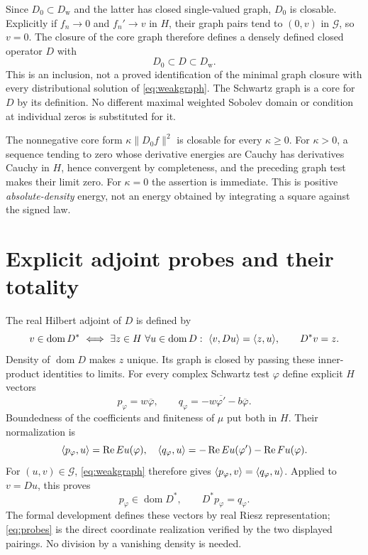 \documentclass[11pt]{article}
\newcommand{\dom}{\operatorname{dom}}\newcommand{\ran}{\operatorname{ran}}
\begin{document}
Since $D_0\subset D_{\mathrm w}$ and the latter has closed
single-valued graph, $D_0$ is closable. Explicitly if $f_n\to0$
and $f_n'\to v$ in $H$, their graph pairs tend to $(0,v)$ in
$\mathcal G$, so $v=0$. The closure of the core graph therefore
defines a densely defined closed operator $D$ with
\begin{equation}\label{eq:minimalweak}
 D_0\subset D\subset D_{\mathrm w}.
\end{equation}
This is an inclusion, not a proved identification of the minimal
graph closure with every distributional solution of
\eqref{eq:weakgraph}. The Schwartz graph is a core for $D$ by
its definition. No different maximal weighted Sobolev domain or
condition at individual zeros is substituted for it.

The nonnegative core form $\kappa\|D_0f\|^2$ is closable for
every $\kappa\geq0$. For $\kappa>0$, a sequence tending to zero
whose derivative energies are Cauchy has derivatives Cauchy in
$H$, hence convergent by completeness, and the preceding graph
test makes their limit zero. For $\kappa=0$ the assertion is
immediate. This is positive \emph{absolute-density} energy, not
an energy obtained by integrating a square against the signed law.

\section{Explicit adjoint probes and their totality}
The real Hilbert adjoint of $D$ is defined by
\[
 v\in\dom D^*\ \Longleftrightarrow\
 \exists z\in H\ \forall u\in\dom D:\ \ip v{Du}=\ip z u,
 \qquad D^*v=z.
\]
Density of $\dom D$ makes $z$ unique. Its graph is closed by
passing these inner-product identities to limits. For every
complex Schwartz test $\varphi$ define explicit $H$ vectors
\begin{equation}\label{eq:probes}
 p_\varphi=w\overline\varphi,\qquad
 q_\varphi=-w\overline{\varphi'}-b\overline\varphi.
\end{equation}
Boundedness of the coefficients and finiteness of $\mu$ put
both in $H$. Their normalization is
\[
 \langle p_\varphi,u\rangle=\operatorname{Re}Eu(\varphi),\quad
 \langle q_\varphi,u\rangle=-\operatorname{Re}Eu(\varphi')
                       -\operatorname{Re}Fu(\varphi).
\]
For $(u,v)\in\mathcal G$, \eqref{eq:weakgraph} therefore gives
$\langle p_\varphi,v\rangle=\langle q_\varphi,u\rangle$. Applied to $v=Du$, this proves
\begin{equation}\label{eq:adjointprobe}
 p_\varphi\in\dom D^*,\qquad D^*p_\varphi=q_\varphi.
\end{equation}
The formal development defines these vectors by real Riesz
representation; \eqref{eq:probes} is the direct coordinate
realization verified by the two displayed pairings. No division
by a vanishing density is needed.
\end{document}
